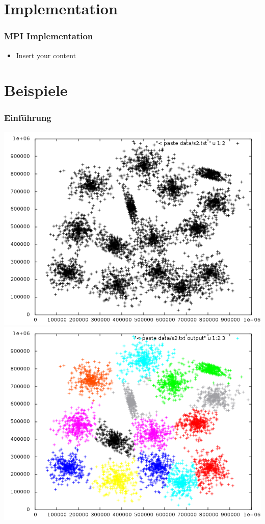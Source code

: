 \documentclass[10pt]{beamer}
\begin{document}
\section{Implementation}
\begin{frame}
	\frametitle{MPI Implementation}
	\begin{itemize}
		\item Insert your content
	\end{itemize}
\end{frame}

\section{Beispiele}
\begin{frame}
	\frametitle{Einf\"uhrung}
	\includegraphics[scale=0.34, keepaspectratio]{../output/pics/s2_black.png}
	\includegraphics[scale=0.34, keepaspectratio]{../output/pics/s2_colored.png}
\end{frame}
\end{document}
